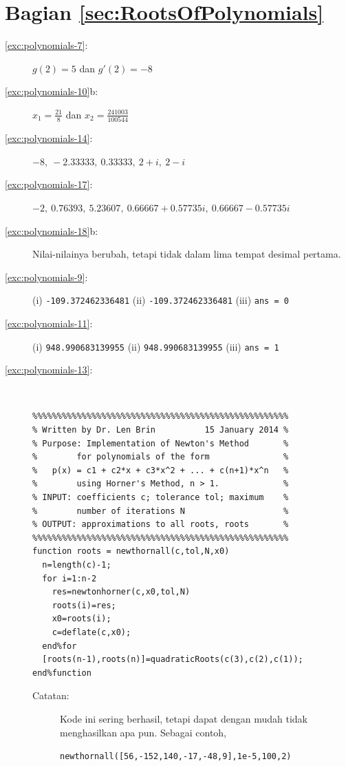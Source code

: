 \section*{Bagian \ref{sec:RootsOfPolynomials}}
\begin{description}
\item [{\ref{exc:polynomials-7}:}] $g(2)=5$ dan $g'(2)=-8$
\item [{\ref{exc:polynomials-10}b:}] $x_{1}=\frac{21}{8}$ dan $x_{2}=\frac{241003}{100544}$
\item [{\ref{exc:polynomials-14}:}] $-8,\ -2.33333,\ 0.33333,\ 2+i,\ 2-i$
\item [{\ref{exc:polynomials-17}:}] $-2,\ 0.76393,\ 5.23607,\ 0.66667+0.57735i,\ 0.66667-0.57735i$
\item [{\ref{exc:polynomials-18}b:}] Nilai-nilainya berubah, tetapi tidak
dalam lima tempat desimal pertama.
\item [{\ref{exc:polynomials-9}:}] (i) \texttt{-109.372462336481} (ii)
\texttt{-109.372462336481} (iii) \texttt{ans = 0}
\item [{\ref{exc:polynomials-11}:}] (i) \texttt{948.990683139955} (ii)
\texttt{948.990683139955} (iii) \texttt{ans = 1}
\item [{\ref{exc:polynomials-13}:}] $\ $ \begin{verbatim}
%%%%%%%%%%%%%%%%%%%%%%%%%%%%%%%%%%%%%%%%%%%%%%%%%%%%
% Written by Dr. Len Brin          15 January 2014 %
% Purpose: Implementation of Newton's Method       %
%        for polynomials of the form               %
%   p(x) = c1 + c2*x + c3*x^2 + ... + c(n+1)*x^n   %
%        using Horner's Method, n > 1.             %
% INPUT: coefficients c; tolerance tol; maximum    %
%        number of iterations N                    %
% OUTPUT: approximations to all roots, roots       %
%%%%%%%%%%%%%%%%%%%%%%%%%%%%%%%%%%%%%%%%%%%%%%%%%%%%
function roots = newthornall(c,tol,N,x0)
  n=length(c)-1;
  for i=1:n-2
    res=newtonhorner(c,x0,tol,N)
    roots(i)=res;
    x0=roots(i);
    c=deflate(c,x0);
  end%for
  [roots(n-1),roots(n)]=quadraticRoots(c(3),c(2),c(1));
end%function
\end{verbatim}

\begin{description}
\item [{Catatan:}] Kode ini sering berhasil, tetapi dapat dengan mudah
tidak menghasilkan apa pun. Sebagai contoh,

\begin{center}
\texttt{newthornall({[}56,-152,140,-17,-48,9{]},1e-5,100,2)}
\par\end{center}


\end{description}
\end{description}
